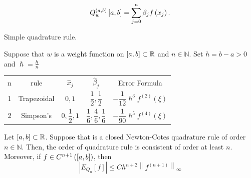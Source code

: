\begin{frame}

    \begin{equation*}
        Q^{\left(a,b\right)}_{w}
        \left[a,b\right]=
        \sum_{j=0}^{n}
        \beta_{j}
        f\left(x_{j}\right).
    \end{equation*}

    Simple quadrature rule.

    \begin{definition}
        Suppose that $w$ is a weight function on
        \begin{math}
            \left[a,b\right]\subset
            \mathbb{R}
        \end{math}
        and $n\in\mathbb{N}$.
        Set $h=b-a>0$ and $\hslash=\frac{h}{n}$
    \end{definition}

    \begin{table}[ht!]
        \centering
        \begin{tabular}{ccccc}
            n & rule                                                          & $\widehat{x}_{j}$  & $\widehat{\beta}_{j}$
              & Error Formula                                                                                                                   \\
            1 & Trapezoidal                                                   & $0,1$              & $\dfrac{1}{2}, \dfrac{1}{2}$
              & $-\dfrac{1}{12}\hslash^{3}f^{\left(2\right)}\left(\xi\right)$                                                                   \\
            2 & Simpson's                                                     & $0,\dfrac{1}{2},1$ & $\dfrac{1}{6}, \dfrac{4}{6}, \dfrac{1}{6}$
              & $-\dfrac{1}{90}\hslash^{5}f^{\left(4\right)}\left(\xi\right)$
        \end{tabular}
    \end{table}

    \begin{theorem}
        Let
        \begin{math}
            \left[a,b\right]\subset
            \mathbb{R}
        \end{math}.
        Suppose that is a closed Newton-Cotes quadrature rule of
        order $n\in\mathbb{N}$.
        Then, the order of quadrature rule is consistent of order at
        least $n$.
        Moreover, if $f\in C^{n+1}\left(\left[a,b\right]\right)$, then
        \begin{equation*}
            \left|
            E_{Q_{n}}
            \left[f\right]
            \right|\leq
            C
            h^{n+2}
            {\left\|f^{\left(n+1\right)}\right\|}_{\infty}
        \end{equation*}
    \end{theorem}
\end{frame}

